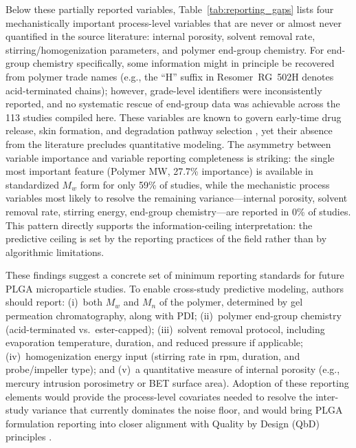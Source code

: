 Below these partially reported variables, Table~\ref{tab:reporting_gaps} lists four mechanistically important process-level variables that are never or almost never quantified in the source literature: internal porosity, solvent removal rate, stirring/homogenization parameters, and polymer end-group chemistry. For end-group chemistry specifically, some information might in principle be recovered from polymer trade names (e.g., the ``H'' suffix in Resomer~RG~502H denotes acid-terminated chains); however, grade-level identifiers were inconsistently reported, and no systematic rescue of end-group data was achievable across the 113 studies compiled here. These variables are known to govern early-time drug release, skin formation, and degradation pathway selection \citep{Fredenberg2011, Makadia2011}, yet their absence from the literature precludes quantitative modeling. The asymmetry between variable importance and variable reporting completeness is striking: the single most important feature (Polymer MW, 27.7\% importance) is available in standardized $M_w$ form for only 59\% of studies, while the mechanistic process variables most likely to resolve the remaining variance---internal porosity, solvent removal rate, stirring energy, end-group chemistry---are reported in 0\% of studies. This pattern directly supports the information-ceiling interpretation: the predictive ceiling is set by the reporting practices of the field rather than by algorithmic limitations.

These findings suggest a concrete set of minimum reporting standards for future PLGA microparticle studies. To enable cross-study predictive modeling, authors should report: (i)~both $M_w$ and $M_n$ of the polymer, determined by gel permeation chromatography, along with PDI; (ii)~polymer end-group chemistry (acid-terminated vs.\ ester-capped); (iii)~solvent removal protocol, including evaporation temperature, duration, and reduced pressure if applicable; (iv)~homogenization energy input (stirring rate in rpm, duration, and probe/impeller type); and (v)~a quantitative measure of internal porosity (e.g., mercury intrusion porosimetry or BET surface area). Adoption of these reporting elements would provide the process-level covariates needed to resolve the inter-study variance that currently dominates the noise floor, and would bring PLGA formulation reporting into closer alignment with Quality by Design (QbD) principles \citep{ICH2009}.


